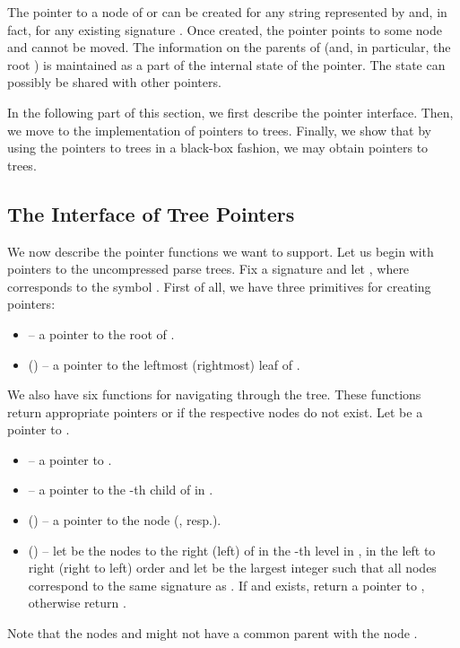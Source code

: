 \documentclass[a4paper]{article}
\theoremstyle{remark}
\begin{document}
The pointer to a node of  or  can be created for any string represented by  and, in fact, for any existing signature .
Once created, the pointer points to some node  and cannot be moved.
The information on the parents of  (and, in particular, the root )
is maintained as a part of the internal state of the pointer.
The state can possibly be shared with other pointers.

In the following part of this section, we first describe the pointer interface.
Then, we move to the implementation of pointers to  trees.
Finally, we show that by using the pointers to  trees in a black-box fashion, we may obtain pointers to  trees.

\subsection{The Interface of Tree Pointers}
We now describe the pointer functions we want to support.
Let us begin with pointers to the uncompressed parse trees.
Fix a signature  and
let , where  corresponds to the symbol .
First of all, we have three primitives for creating pointers:
\begin{itemize}
  \item  -- a pointer to the root of .
  \item  () -- a pointer to the leftmost (rightmost) leaf of .
\end{itemize}
We also have six functions for navigating through the tree.
These functions return appropriate pointers or  if the respective nodes do not exist.
Let  be a pointer to .
\begin{itemize}
  \item  -- a pointer to .
  \item  -- a pointer to the -th child of  in .
  \item  () -- a pointer to the node  (, resp.).
  \item  () --
    let  be the nodes to the right (left) of 
    in the -th level in , in the left to right (right to left) order
    and let  be the largest integer such that
    all nodes  correspond to the same signature as .
    If  and  exists, return a pointer to ,
    otherwise return .

\end{itemize}
Note that the nodes  and  might not have a common parent with the node .
\end{document}

